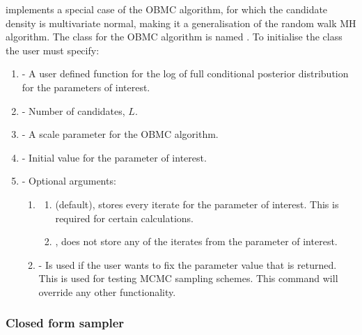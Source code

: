 \documentclass[article]{jss}
\begin{document}
 implements a special case of the OBMC algorithm, for
which the candidate density is multivariate normal, making it a
generalisation of the random walk MH algorithm. The class for the OBMC
algorithm is named . To initialise the class the user must
specify:
\begin{enumerate}
\item {} - A user defined function for the log of full
  conditional posterior distribution for the parameters of interest.
\item {} - Number of candidates, $L$.
\item {} - A scale parameter for the OBMC algorithm.
\item {} - Initial value for the parameter of interest. 
\item {} - Optional arguments:

  \begin{enumerate}
  \item {}
    \begin{enumerate}
    \item {} (default), stores every iterate for the
      parameter of interest. This is required for certain
      calculations.
    \item {}, does not store any of the iterates from the
      parameter of interest.
      \end{enumerate}
    \item {} - Is used if the user wants to fix
      the parameter value that is returned. This is used for testing
      MCMC sampling schemes.  This command will override any other
      functionality.
  \end{enumerate}
\end{enumerate}

\subsubsection{Closed form sampler}
\end{document}
